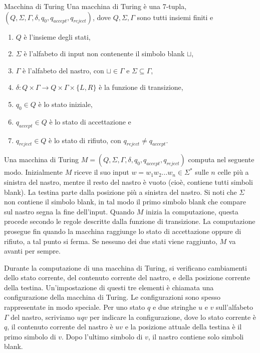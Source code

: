 \begin{Definition}{Macchina di Turing}{}
Una macchina di Turing è una 7-tupla, $(Q, \Sigma, \Gamma, \delta, q_0, q_{accept}, q_{reject})$, dove $Q, \Sigma, \Gamma$ sono tutti insiemi finiti e
\begin{enumerate}
    \item $Q$ è l'insieme degli stati,
    \item $\Sigma$ è l'alfabeto di input non contenente il simbolo blank $\sqcup$,
    \item $\Gamma$ è l'alfabeto del nastro, con $\sqcup \in\Gamma$ e $\Sigma\subseteq\Gamma$,
    \item $\delta: Q\times\Gamma\to Q\times\Gamma\times\{L, R\}$ è la funzione di transizione,
    \item $q_{0} \in Q$ è lo stato iniziale,
    \item $q_{accept}\in Q$ è lo stato di accettazione e
    \item $q_{reject}\in Q$ è lo stato di rifiuto, con $q_{reject}\neq q_{accept}$.
\end{enumerate}
\end{Definition}

Una macchina di Turing $M=( Q, \Sigma, \Gamma, \delta, q_{0}, q_{accept}, q_{reject})$ computa nel seguente modo. Inizialmente $M$ riceve il suo input $w= w_{1}w_{2}...w_n\in\Sigma^*$ sulle $n$ celle più a sinistra del nastro, mentre il resto del nastro è vuoto (cioè, contiene tutti simboli blank). La testina parte dalla posizione più a sinistra del nastro. Si noti che $\Sigma$ non contiene il simbolo blank, in tal modo il primo simbolo blank che compare sul nastro segna la fine dell'input. Quando $M$ inizia la computazione, questa procede secondo le regole descritte dalla funzione di transizione. La computazione prosegue fin quando la macchina raggiunge lo stato di accettazione oppure di rifiuto, a tal punto si ferma. Se nessuno dei due stati viene raggiunto, $M$ va avanti per sempre. 

Durante la computazione di una macchina di Turing, si verificano cambiamenti dello stato corrente, del contenuto corrente del nastro, e della posizione corrente della testina. Un'impostazione di questi tre elementi è chiamata una configurazione della macchina di Turing. Le configurazioni sono spesso rappresentate in modo speciale. Per uno stato $q$ e due stringhe $u$ e $v$ sull'alfabeto $\Gamma$ del nastro, scriviamo $uqv$ per indicare la configurazione, dove lo stato corrente è $q$, il contenuto corrente del nastro è $uv$ e la posizione attuale della testina è il primo simbolo di $v$. Dopo l'ultimo simbolo di $v$, il nastro contiene solo simboli blank. 

